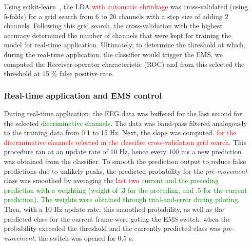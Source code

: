 Using scikit-learn~\cite{Pedregosa2012-sj}, the LDA \textcolor{red}{with automatic shrinkage} was cross-validated (using 5-folds) for a grid search from 6 to 20 channels with a step size of adding 2 channels. Following this grid search, the cross-validation with the highest accuracy determined the number of channels that were kept for training the model for real-time application. Ultimately, to determine the threshold at which, during the real-time application, the classifier would trigger the EMS, we computed the Receiver-operator characteristic (ROC) and from this selected the threshold at 15 \% false positive rate.

\subsubsection{Real-time application and EMS control}
During real-time application, the EEG data was buffered for the last second for the selected \textcolor{green}{discriminative channels}. The data was band-pass filtered analogously to the training data from 0.1 to 15 Hz. Next, the slope was computed. \textcolor{red}{for the discriminative channels selected in the classifier cross-validation grid search.} This procedure ran at an update rate of 10 Hz, hence every 100 ms a new prediction was obtained from the classifier. To smooth the prediction output to reduce false predictions due to unlikely peaks, the predicted probability for the \textit{pre-movement} class was smoothed by averaging the \textcolor{red}{last two} \textcolor{green}{current and the preceding prediction with a weighting (weight of .3 for the preceding, and .5 for the current prediction). The weights were obtained through trial-and-error during piloting}. Then, with a 10 Hz update rate, this smoothed probability, as well as the predicted class for the current frame were gating the EMS switch: when the probability exceeded the threshold and the currently predicted class was \textit{pre-movement}, the switch was opened for 0.5 s.



